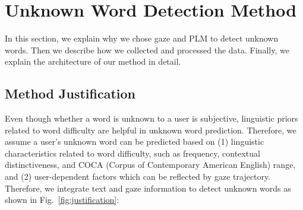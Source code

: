 \section{Unknown Word Detection Method}
\label{sec:method}

In this section, we explain why we chose gaze and PLM to detect unknown words. Then we describe how we collected and processed the data. Finally, we explain the architecture of our method in detail.


\subsection{Method Justification}
Even though whether a word is unknown to a user is subjective, linguistic priors related to word difficulty are helpful in unknown word prediction. Therefore, we assume a user's unknown word can be predicted based on (1) linguistic characteristics related to word difficulty, such as frequency, contextual distinctiveness, and COCA (Corpus of Contemporary American English) range, and (2) user-dependent factors which can be reflected by gaze trajectory. Therefore, we integrate text and gaze information to detect unknown words as shown in Fig.~\ref{fig:justification}:
